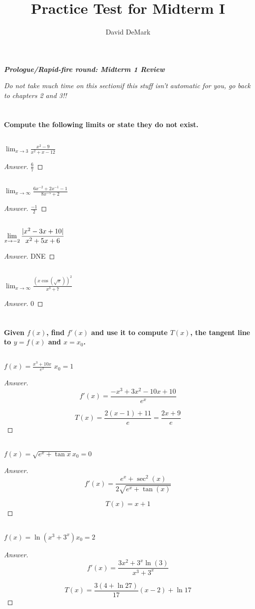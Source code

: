 \documentclass[english,fleqn]{article}
\title{Practice Test for Midterm I}
\author{David DeMark}
\date{\due}
\DeclarePairedDelimiter\abs{\lvert}{\rvert}%
\newcommand{\prob}[1]{\setcounter{section}{#1-1}\section{}}
\newcommand{\prt}[1]{\setcounter{subsection}{#1-1}\subsection{}}
\theoremstyle{remark}
\theoremstyle{definition}
\newcommand{\ild}[1]{\displaystyle{#1}}
\begin{document}
	\begin{center}{\Large\textbf{\emph{Prologue/Rapid-fire round: Midterm 1 Review}}}\end{center}
	\emph{Do not take much time on this section\textemdash if this stuff isn't automatic for you, go back to chapters 2 and 3!!}

	\prob{-2} \textbf{Compute the following limits or state they do not exist.}
	\prt{1}$\ild{\lim_{x\to 3}\frac{x^2-9}{x^2+x-12}}$%
	\begin{proof}[Answer]
		$\frac{6}{7}$
	\end{proof}
	\vspace{1cm}
	\prt{2}$\ild{\lim_{x\to\infty}\frac{6x^{-2}+2x^{-1}-1}{8x^{-5}+2}}$%
		\begin{proof}[Answer]
		$\frac{-1}{2}$
	\end{proof}
	\vspace{1cm}
	\prt{3} $\ild{\lim_{x\to -2}\frac{\abs{x^2-3x+10}}{x^2+5x+6}}$
		\begin{proof}[Answer]
	DNE
	\end{proof}
\vspace{1cm}
\prt{4} $\ild{\lim_{x\to \infty} \frac{(x\cos(\sqrt{x}))^2}{x^3+7}}$
	\begin{proof}[Answer]
	$0$
\end{proof}
\vspace{1cm}
\prob{-1} \textbf{Given $f(x)$, find $f'(x)$ and use it to compute $T(x)$, the tangent line to $y=f(x)$ and $x=x_0$.}
\prt{1} $\ild{f(x)= \frac{x^3+10x}{e^x}}$
\newline$x_0=1$%
	\begin{proof}[Answer]
	\[f'(x)=\frac{-x^3+3x^2-10x+10}{e^x}\]
	
	\[T(x)=\frac{2(x-1)+11}{e}=\frac{2x+9}{e}\]
\end{proof}


\prt{2} $\ild{f(x)=\sqrt{e^x+\tan{x}}}$\newline$x_0=0$%
	\begin{proof}[Answer]
	\[f'(x)=\frac{e^x+\sec ^2(x)}{2 \sqrt{e^x+\tan (x)}}\]
	
	\[T(x)=x+1\]
\end{proof}
\prt{3} $\ild{f(x)=\ln(x^3+3^x)}$\newline$x_0=2$%
	\begin{proof}[Answer]
	\[f'(x)=\frac{3 x^2+3^x \ln (3)}{x^3+3^x}\]
	
	\[T(x)=\frac{3(4+\ln27)}{17}(x-2)+\ln 17\]
\end{proof}
\end{document}
